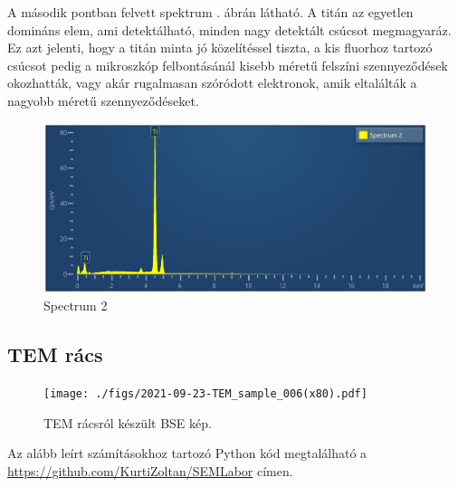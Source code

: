 \documentclass[pdftex,12pt,a4paper]{article}
\begin{document}
			A második pontban felvett spektrum . ábrán látható. A titán az egyetlen domináns elem, ami detektálható, minden nagy detektált csúcsot megmagyaráz. Ez azt jelenti, hogy a titán minta jó közelítéssel tiszta, a kis fluorhoz tartozó csúcsot pedig a mikroszkóp felbontásánál kisebb méretű felszíni szennyeződések okozhatták, vagy akár rugalmasan szóródott elektronok, amik eltalálták a nagyobb méretű szennyeződéseket.
			\begin{figure}[H]
				\centering
				\includegraphics[scale=0.7]{./figs/spectrum2.png}
				\caption{Spectrum 2}
				\label{spectrum2}
			\end{figure}
	\subsection{TEM rács}
		\begin{figure}[H]
			\centering
			\texttt{[image: ./figs/2021-09-23-TEM\_sample\_006(x80).pdf]}
			\caption{TEM rácsról készült BSE kép.}
			\label{temgrid}
		\end{figure}
		Az alább leírt számításokhoz tartozó Python kód megtalálható a \url{https://github.com/KurtiZoltan/SEMLabor} címen.
		
\end{document}
